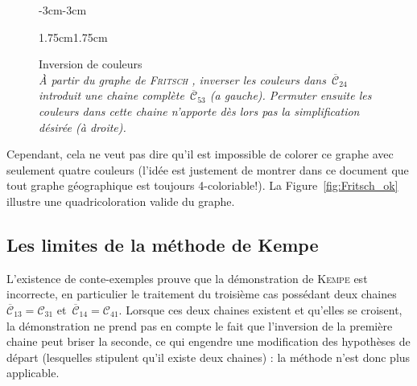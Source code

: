 \begin{figure}[!h]\centering
	\begin{changemargin}{-3cm}{-3cm}
		\begin{center}
			
			\hspace{15pt}
			
		\end{center}
	\end{changemargin}
	\begin{changemargin}{1.75cm}{1.75cm}
		\caption{Inversion de couleurs\\ \footnotesize\textit{À partir du graphe de \textsc{Fritsch} , inverser les couleurs dans~$\overline{\mathcal{C}}_{24}$ introduit une chaine complète~$\overline{\mathcal{C}}_{53}$ (a gauche). Permuter ensuite les couleurs dans cette chaine n'apporte dès lors pas la simplification désirée (à droite).}}\label{fig:Fritsch_Inversion}
	\end{changemargin}	
\end{figure}
\FloatBarrier	


Cependant, cela ne veut pas dire qu'il est impossible de colorer ce graphe avec seulement quatre couleurs (l'idée est justement de montrer dans ce document que tout graphe géographique est toujours 4-coloriable!). La Figure~\ref{fig:Fritsch_ok} illustre une quadricoloration valide du graphe.

\begin{SCfigure}[][!ht]
	
	\caption{\\Exemple de coloration%
	}\label{fig:Fritsch_ok}
\end{SCfigure}
\FloatBarrier

\subsection{Les limites de la méthode de Kempe}

L'existence de conte-exemples prouve que la démonstration de \textsc{Kempe} est incorrecte, en particulier le traitement du troisième cas possédant deux chaines~$\overline{\mathcal{C}}_{13}=\mathcal{C}_{31}$ et~$\overline{\mathcal{C}}_{14}=\mathcal{C}_{41}$. Lorsque ces deux chaines existent et qu'elles se croisent, la démonstration ne prend pas en compte le fait que l'inversion de la première chaine peut briser la seconde, ce qui engendre une modification des hypothèses de départ (lesquelles stipulent qu'il existe deux chaines) : la méthode n'est donc plus applicable.\\


